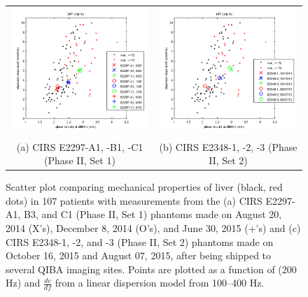 \begin{figure}[htb!]
    \centering
    \begin{tabular}{cc}
        \includegraphics[width=0.5\linewidth]{figs/phantom_liver_scatter_plot.png} &
        \includegraphics[width=0.5\linewidth]{figs/phaseIIset2scatterplot.png} \\
        (a) CIRS E2297-A1, -B1, -C1 (Phase II, Set 1) &
        (b) CIRS E2348-1, -2, -3 (Phase II, Set 2) \\
    \end{tabular}
    \caption{Scatter plot comparing mechanical properties of liver (black, red
        dots) in 107 patients with measurements from the (a) CIRS E2297-A1,
        B3, and C1 (Phase II, Set 1) phantoms made on August 20, 2014 (X’s),
        December 8, 2014 (O’s), and June 30, 2015 (+’s) and (c) CIRS
        E2348-1, -2, and -3 (Phase II, Set 2) phantoms made on October 16, 2015
        and August 07, 2015, after being shipped to several QIBA imaging sites. 
        Points are plotted as a function of (200 Hz) and $\frac{dc}{df}$ from a
        linear dispersion model from 100--400 Hz.}
\label{fig:phantom_liver_scatter_plot}
\end{figure}
